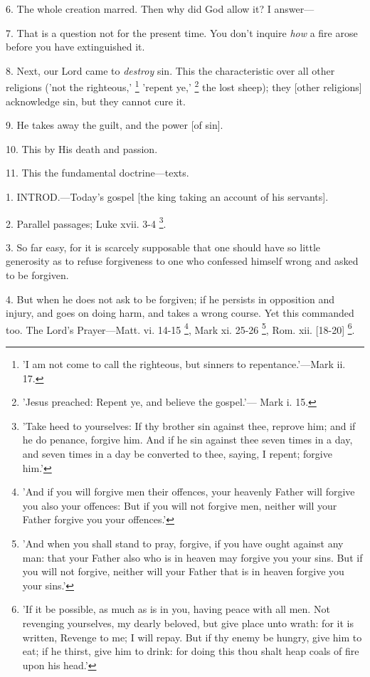 6. The whole creation marred. Then why did God
allow it? I answer—

7. That is a question not for the present time.
You don't inquire \emph{how} a fire arose before you have extinguished
it.

8. Next, our Lord came to \emph{destroy} sin.
This the characteristic over all other religions ('not the righteous,'
\footnote{'I am not come to call
the righteous, but sinners to repentance.'—Mark ii. 17.} 'repent ye,' \footnote{'Jesus preached: Repent
ye, and believe the gospel.'— Mark i. 15.} the lost sheep); they [other religions] acknowledge sin, but
they cannot cure it.

9. He takes away the guilt, and the power [of
sin].

10. This by His death and passion.

11. This the fundamental doctrine—texts.


1. INTROD.—Today's
gospel [the king taking an account of his servants].

2. Parallel passages; Luke xvii. 3-4 \footnote{'Take heed to
yourselves: If thy brother sin against thee, reprove him; and if he do
penance, forgive him. And if he sin against thee seven times in a day,
and seven times in a day be converted to thee, saying, I repent;
forgive him.'}.

3. So far easy, for it is scarcely supposable
that one should have so little generosity as to refuse
forgiveness to one who confessed himself wrong and asked to be
forgiven.

4. But when he does not ask to be forgiven; if he
persists in opposition and injury, and goes on doing harm, and takes a
wrong course. Yet this commanded too. The Lord's Prayer—Matt. vi.
14-15 \footnote{'And if you will forgive
men their offences, your heavenly Father will forgive you also your
offences: But if you will not forgive men, neither will your Father
forgive you your offences.'}, Mark xi. 25-26
\footnote{'And when you shall
stand to pray, forgive, if you have ought against any man: that your
Father also who is in heaven may forgive you your sins. But if you
will not forgive, neither will your Father that is in heaven forgive
you your sins.'}, Rom. xii. [18-20] \footnote{'If it be possible, as
much as is in you, having peace with all men. Not revenging
yourselves, my dearly beloved, but give place unto wrath: for it is
written, Revenge to me; I will repay. But if thy enemy be hungry, give
him to eat; if he thirst, give him to drink: for doing this thou shalt
heap coals of fire upon his head.'}.

